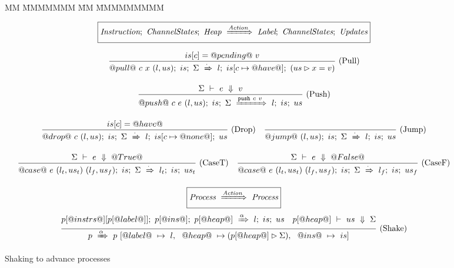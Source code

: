 
\begin{figure}
\begin{tabbing}
MM \= MMMMMMM \= MM \= MMMMMMMMM\kill
\end{tabbing}


$$
  \boxed{
    \textit{Instruction};~\textit{ChannelStates};~\textit{Heap}~\xRightarrow{\textit{Action}}~\textit{Label};~\textit{ChannelStates};~\textit{Updates}
  }
$$

$$
\enskip \frac {\displaystyle 
  is[c] = @pending@~v
} {\displaystyle 
  @pull@~c~x~(l,us);~is;~\Sigma~\xRightarrow{\cdot}~l;~is[c \mapsto @have@];~(us \rhd x = v)
} \  \mbox{(Pull)} \enskip
$$

$$
\enskip \frac {\displaystyle 
  \Sigma~\vdash~e~\Downarrow~v
} {\displaystyle 
  @push@~c~e~(l,us);~is;~\Sigma~\xRightarrow{\texttt{push}~c~v}~l;~is;~us
} \  \mbox{(Push)} \enskip
$$

$$
\enskip \frac {\displaystyle 
  is[c] = @have@
} {\displaystyle 
  @drop@~c~(l,us);~is;~\Sigma~\xRightarrow{\cdot}~l;~is[c \mapsto @none@];~us
} \  \mbox{(Drop)} \enskip
\enskip \frac {\displaystyle 
} {\displaystyle 
  @jump@~(l,us);~is;~\Sigma~\xRightarrow{\cdot}~l;~is;~us
} \  \mbox{(Jump)} \enskip
$$

$$
\enskip \frac {\displaystyle 
  \Sigma~\vdash~e~\Downarrow~@True@
} {\displaystyle 
  @case@~e~(l_t,us_t)~(l_f,us_f);~is;~\Sigma~\xRightarrow{\cdot}~l_t;~is;~us_t
} \  \mbox{(CaseT)} \enskip
\enskip \frac {\displaystyle 
  \Sigma~\vdash~e~\Downarrow~@False@
} {\displaystyle 
  @case@~e~(l_t,us_t)~(l_f,us_f);~is;~\Sigma~\xRightarrow{\cdot}~l_f;~is;~us_f
} \  \mbox{(CaseF)} \enskip
$$

\vspace{2em}

$$
  \boxed{\textit{Process}~\xRightarrow{\textit{Action}}~\textit{Process}}
$$
$$
\enskip \frac {\displaystyle 
  p[@instrs@][p[@label@]];~p[@ins@];~p[@heap@]~\xRightarrow{\alpha}~l;~is;~us
  \quad
    p[@heap@]~\vdash~us~\Downarrow~\Sigma
} {\displaystyle 
  p~\xRightarrow{\alpha}~p~[    @label@~ \mapsto ~l
           , ~~ @heap@~  \mapsto (p[@heap@] \rhd \Sigma)
           , ~~ @ins@~   \mapsto ~is]
} \  \mbox{(Shake)} \enskip
$$


\caption{Shaking to advance processes}

\label{fig:Process:Eval:Shake}
\end{figure}

